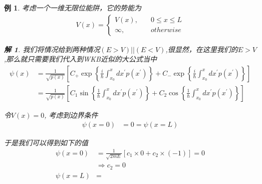 \documentclass{article}
\newtheorem{example}{例}
\newtheorem{solution}{解}
\begin{document}
\begin{example}
    考虑一个一维无限位能阱，它的势能为
    \begin{align*}
        V(x)=
        \begin{cases}
            V(x),&\quad 0\leq x\leq L\\
            \infty,&\quad otherwise
        \end{cases}
    \end{align*}
    \begin{solution}
        我们将情况给到两种情况$(E>V)||(E<V)$,很显然，在这里我们的$E>V$,那么就只需要我们代入到WKB近似的大公式当中
        \begin{align*}
            \psi(x)&=\frac{1}{\sqrt{p(x)}}\left[C_+\exp\left\{\frac{i}{\hbar}\int_{x_0}^{x}dx^\prime p(x^\prime)\right\}+C_-\exp\left\{\frac{i}{\hbar}\int_{x_0}^{x}dx^\prime p(x^\prime)\right\}\right]\\
            &=\frac{1}{\sqrt{p(x)}}\left[C_1\sin\left\{\frac{1}{\hbar}\int_{x_0}^{x}dx^\prime p(x^\prime)\right\}+C_2\cos\left\{\frac{1}{\hbar}\int_{x_0}^{x}dx^\prime p(x^\prime)\right\}\right]
        \end{align*}
        
        令$V(x)=0$,
        考虑到边界条件
        \begin{align*}
            \psi(x=0)&=0=\psi(x=L)
        \end{align*}

        于是我们可以得到如下的值
        \begin{align*}
            \psi(x=0)&=\frac{1}{\sqrt{2mE}}\left[c_1\times 0+c_2\times (-1)\right]=0\\
            &\Rightarrow c_2=0\\
            \psi(x=L)&=
        \end{align*}
    \end{solution}
\end{example}
\end{document}
